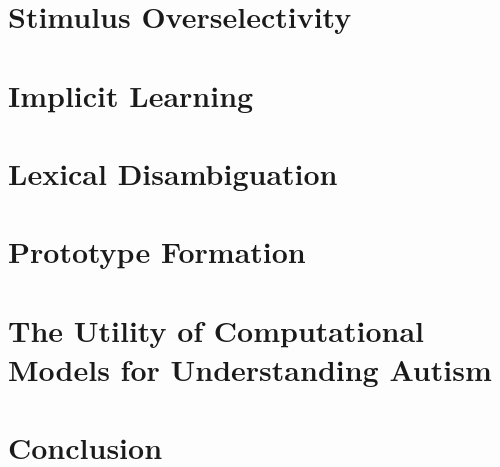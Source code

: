 \documentclass[]{book}
\begin{document}
 \section{Stimulus Overselectivity}
 \label{section:overselectivity}
 
 


\section{Implicit Learning}
\label{section:implicit}




\section{Lexical Disambiguation}
\label{section:lexical}




\section{Prototype Formation}
\label{section:prototype}




% 
% 


\section{The Utility of Computational Models for Understanding Autism}
\label{section:modeling}




\section{Conclusion}
\label{section:conclusion}




% 



\backmatter
\end{document}

